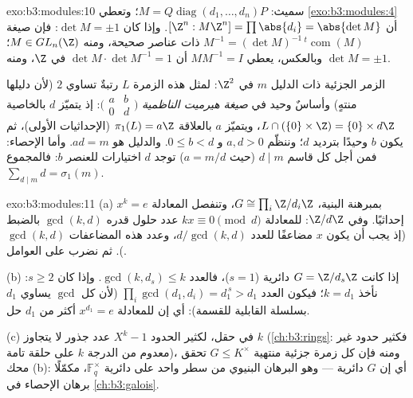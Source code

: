 \begin{solution}{exo:b3:modules:10}
سميث: $M = Q\operatorname{diag}(d_1,\dots,d_n)P$؛ وتعطي \cref{exo:b3:modules:4} أن $[\Z^n : M\Z^n] = \prod\abs{d_i} =
\abs{\det M}$. وإذا كان
$\det M = \pm 1$: فإن صيغة  $M^{-1} = (\det M)^{-1}\,{}^{t}\!\operatorname{com}(M)$ ذات عناصر
صحيحة، ومنه $M \in GL_n(\Z)$؛ وبالعكس، يعطي $MM^{-1} = I$ أن
$\det M \cdot \det M^{-1} = 1$ في $\Z$، ومنه $\det M = \pm1$.

الزمر الجزئية ذات الدليل $m$ في $\Z^2$: لمثل هذه الزمرة $L$
رتبةٌ تساوي $2$ (لأن دليلها منتهٍ) وأساسٌ وحيد في \emph{صيغة
هيرميت الناظمية} $\bigl(\begin{smallmatrix} a & b\\ 0 &
d\end{smallmatrix}\bigr)$: إذ يتميّز $d$ بالخاصية $L \cap (\{0\}
\times \Z) = \{0\} \times d\Z$،
ويتميّز $a$ بالعلاقة $\pi_1(L) = a\Z$ (الإحداثيات الأولى)، ثم
يكون $b$ وحيدًا بترديد $d$؛ وننظّم $a, d
> 0$ و $0 \leq b < d$.
والدليل هو $ad = m$. وأما الإحصاء: فمن أجل كل قاسم $d \mid m$
(حيث $a = m/d$) توجد $d$ اختيارات للعنصر $b$: فالمجموع $\sum_{d \mid m} d = \sigma_1(m)$.
\end{solution}

\begin{solution}{exo:b3:modules:11}
(a) بمبرهنة البنية، $G \cong \prod_i\Z/d_i\Z$، وتنفصل المعادلة $x^k = e$ إحداثيًا.
وفي $\Z/d\Z$: للمعادلة $kx \equiv 0
\pmod d$ عدد حلول قدره $\gcd(k, d)$ بالضبط (إذ
يجب أن يكون $x$ مضاعفًا للعدد $d/\gcd(k,d)$، وعدد هذه المضاعفات
$\gcd(k, d)$). ثم نضرب على العوامل.

(b) إذا كانت $G = \Z/d_s\Z$ دائرية ($s = 1$)، فالعدد $\gcd(k, d_s) \leq k$.
وإذا كان $s \geq 2$: نأخذ $k = d_1$؛ فيكون العدد $\prod_i\gcd(d_1, d_i) = d_1^{\,s} > d_1$ (لأن
كل $\gcd$ يساوي $d_1$ بسلسلة القابلية للقسمة): أي إن
للمعادلة $x^{d_1} = e$ أكثر من $d_1$ حل.

(c) في حقل، لكثير الحدود $X^k - 1$ عدد جذور لا يتجاوز $k$
(\cref{ch:b3:rings}: فكثير حدود غير معدوم من الدرجة $k$ على حلقة تامة)،
ومنه فإن كل زمرة جزئية منتهية $G \leq K^\times$ تحقق محك (b): أي إن $G$
دائرية --- وهو البرهان البنيوي من سطر واحد على دائرية $\mathbb F_q^\times$،
مكمّلًا برهان الإحصاء في \cref{ch:b3:galois}.
\end{solution}

